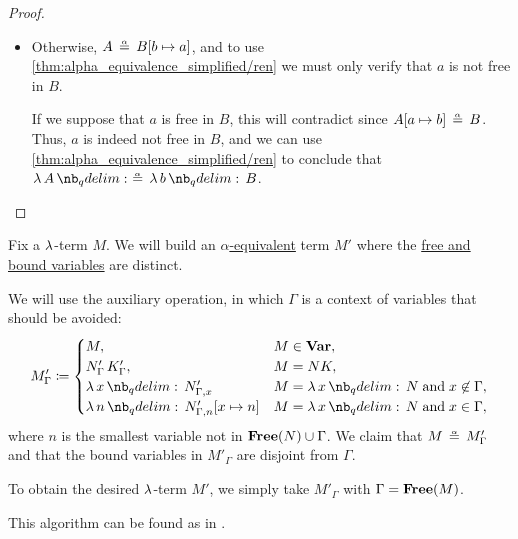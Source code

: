 \begin{proof}
\begin{itemize}
    \item Otherwise, \( A \aequiv B[b \mapsto a] \), and to use \ref{thm:alpha_equivalence_simplified/ren} we must only verify that \( a \) is not free in \( B \).

    If we suppose that \( a \) is free in \( B \), this will contradict  since \( A[a \mapsto b] \aequiv B \). Thus, \( a \) is indeed not free in \( B \), and we can use \ref{thm:alpha_equivalence_simplified/ren} to conclude that \( \qabs A \aequiv \qabs b B \).
  \end{itemize}
\end{proof}

\begin{algorithm}\label{alg:separation_of_free_and_bound_variables}
  Fix a \( \mathrm{\lambda} \)-term \( M \). We will build an \hyperref[def:lambda_term_alpha_equivalence]{\( \alpha \)-equivalent} term \( M' \) where the \hyperref[def:lambda_variable_freeness]{free and bound variables} are distinct.

  We will use the auxiliary operation, in which \( \Gamma \) is a context of variables that should be avoided:
  \begin{equation*}
    M'_\Gamma \coloneqq \begin{cases}
      M,                                 &M \in \op*{Var}, \\
      N'_\Gamma \thinspace K'_\Gamma,    &M = NK, \\
      \qabs x N'_{\Gamma,x}              &M = \qabs x N \T{and} x \not\in \Gamma, \\
      \qabs n N'_{\Gamma,n}[x \mapsto n] &M = \qabs x N \T{and} x \in \Gamma,
    \end{cases}
  \end{equation*}
  where \( n \) is the smallest variable not in \( \op*{Free}(N) \cup \Gamma \). We claim that \( M \aequiv M'_\Gamma \) and that the bound variables in \( M'_\Gamma \) are disjoint from \( \Gamma \).

  To obtain the desired \( \mathrm{\lambda} \)-term \( M' \), we simply take \( M'_\Gamma \) with \( \Gamma = \op*{Free}(M) \).
\end{algorithm}
\begin{comments}
  \item This algorithm can be found as  in \cite{code}.
\end{comments}
